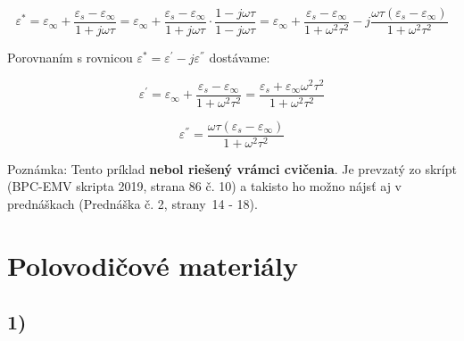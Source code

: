 \begin{equation*}
    {\varepsilon^{*}}={\varepsilon_\infty}+\frac{{\varepsilon_s}-{\varepsilon_\infty}}{1+j\omega\tau}={\varepsilon_\infty}+\frac{{\varepsilon_s}-{\varepsilon_\infty}}{1+j\omega\tau}\cdot\frac{1-j\omega\tau}{1-j\omega\tau}={\varepsilon_\infty}+\frac{{\varepsilon_s}-{\varepsilon_\infty}}{1+{\omega}^2{\tau}^2}-j \frac{\omega\tau({\varepsilon_s}-{\varepsilon_\infty})}{1+{\omega}^2{\tau}^2}
\end{equation*}

Porovnaním s rovnicou ${\varepsilon^{*}}={\varepsilon^{'}}-{j\varepsilon^{''}}$ dostávame:

\begin{equation*}
    {\varepsilon^{'}}={\varepsilon_\infty}+\frac{{\varepsilon_s}-{\varepsilon_\infty}}{1+{\omega}^2{\tau}^2}=\frac{{\varepsilon_s}+{\varepsilon_\infty}{\omega}^2{\tau}^2}{1+{\omega}^2{\tau}^2} \tag{Reálna časť}
\end{equation*}

\begin{equation*}
    {\varepsilon^{''}}=\frac{\omega\tau({\varepsilon_s}-{\varepsilon_\infty})}{1+{\omega}^2{\tau}^2} \tag{Imaginárna časť}
\end{equation*}

\color{red}Poznámka: Tento príklad \textbf{nebol riešený vrámci cvičenia}. Je prevzatý zo skrípt (BPC-EMV skripta 2019, strana 86 č. 10) a takisto ho možno nájsť aj v prednáškach (Prednáška č. 2, strany~14 - 18). \\

\color{black}

\newpage


\section{Polovodičové materiály}

\subsection*{1)}

